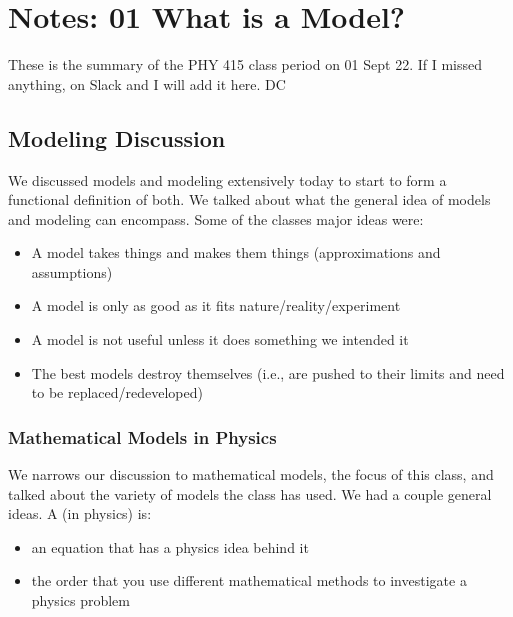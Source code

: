\documentclass[letterpaper,10pt,english]{jupyterBook}
\begin{document}
\section{Notes: 01 \sphinxhyphen{} What is a Model?}
\label{\detokenize{content/1_modeling/notes-what_is_a_model:notes-01-what-is-a-model}}\label{\detokenize{content/1_modeling/notes-what_is_a_model::doc}}
\sphinxAtStartPar
These is the summary of the PHY 415 class period on 01 Sept 22. If I missed anything,  on Slack and I will add it here. \sphinxhyphen{}DC


\subsection{Modeling Discussion}
\label{\detokenize{content/1_modeling/notes-what_is_a_model:modeling-discussion}}
\sphinxAtStartPar
We discussed models and modeling extensively today to start to form a functional definition of both. We talked about what the general idea of models and modeling can encompass. Some of the classes major ideas were:
\begin{itemize}
\item {} 
\sphinxAtStartPar
A model takes  things and makes them  things (approximations and assumptions)

\item {} 
\sphinxAtStartPar
A model is only as good as it fits nature/reality/experiment

\item {} 
\sphinxAtStartPar
A model is not useful unless it does something we intended it

\item {} 
\sphinxAtStartPar
The best models destroy themselves (i.e., are pushed to their limits and need to be replaced/redeveloped)

\end{itemize}


\subsubsection{Mathematical Models in Physics}
\label{\detokenize{content/1_modeling/notes-what_is_a_model:mathematical-models-in-physics}}
\sphinxAtStartPar
We narrows our discussion to mathematical models, the focus of this class, and talked about the variety of models the class has used. We had a couple general ideas. A  (in physics) is:
\begin{itemize}
\item {} 
\sphinxAtStartPar
an equation that has a physics idea behind it

\item {} 
\sphinxAtStartPar
the order that you use different mathematical methods to investigate a physics problem

\end{itemize}
\end{document}
